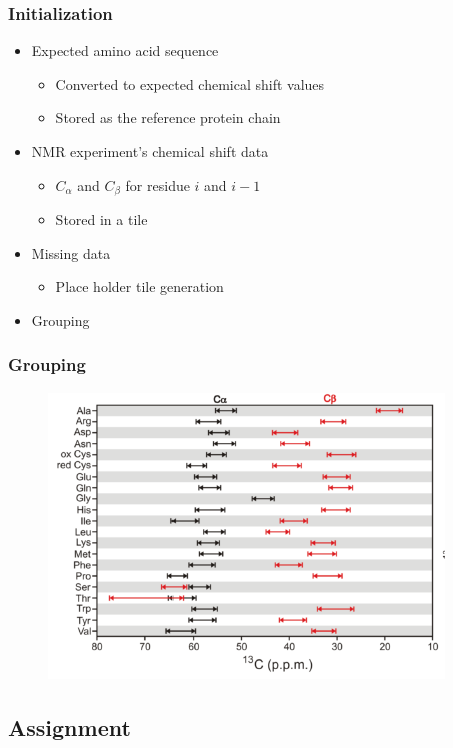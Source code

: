 \documentclass{beamer}
\begin{document}
\begin{frame}
	\frametitle{Initialization}
	\begin{itemize}
		\item Expected amino acid sequence
		\begin{itemize}
			\item Converted to expected chemical shift values
			\item Stored as the reference protein chain
		\end{itemize}
		\item NMR experiment's chemical shift data
		\begin{itemize}
			\item $C_\alpha$ and $C_{\beta}$ for residue $i$ and $i-1$
			\item Stored in a tile
		\end{itemize}
		\item Missing data
		\begin{itemize}
			\item Place holder tile generation
		\end{itemize}
		\item Grouping 
	\end{itemize}
\end{frame}

\begin{frame}
	\frametitle{Grouping}
	\begin{figure}[H]
	\begin{center}
	\includegraphics[width=.65\textwidth]{carbon}
	\end{center}
	\end{figure}
\hfill \scriptsize\cite{carbon}
\end{frame}

\subsection{Assignment}
\end{document}
